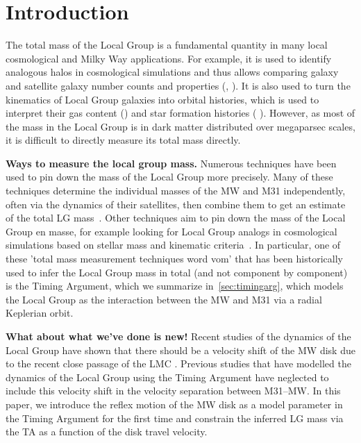 \documentclass[twocolumn]{aastex631}
\begin{document}
\section{Introduction}
\label{sec:intro}
The total mass of the Local Group is a fundamental quantity in many local
cosmological and Milky Way applications.
For example, it is used to identify analogous halos in cosmological simulations
and thus allows comparing galaxy and satellite galaxy number counts and
properties (, \citep{Patel2017a,Dooley2017,Besla2018,Patel2018,Sawala2022}).
It is also used to turn the kinematics of Local Group galaxies into orbital
histories, which is used to interpret their gas content () and star formation histories ( \citep{Weisz2011}).
However, as most of the mass in the Local Group is in dark matter distributed
over megaparsec scales, it is difficult to directly measure its total mass
directly.

\textbf{Ways to measure the local group mass.}
Numerous techniques have been used to pin down the mass of the Local Group
more precisely.
Many of these techniques determine the individual masses of the MW and M31
independently, often via the dynamics of their satellites, then combine them to
get an estimate of the total LG mass~\citep{Watkins2010,Diaz2014,Patel2018}.
Other techniques aim to pin down the mass of the Local Group en masse, for
example looking for Local Group analogs in cosmological simulations
based on stellar mass and kinematic criteria~\citep{Zhai2020}.
In particular, one of these 'total mass measurement techniques word vom'
that has been historically used to infer the
Local Group mass in total (and not component by component) is the Timing
Argument, which we summarize in~\ref{sec:timingarg}, which models the Local
Group as the interaction between the MW and M31 via a radial Keplerian orbit.

\textbf{What about what we've done is new!}
Recent studies of the dynamics of the Local Group have shown that there should
be a velocity shift of the MW disk due to the recent close passage of the LMC
\citep{Gomez2015,Garavito-Camargo2021b}.
Previous studies that have modelled the dynamics of the Local Group using the
Timing Argument have neglected to include this velocity shift in the velocity
separation between M31--MW.
In this paper, we introduce the reflex motion of the
MW disk as a model parameter in the Timing Argument for the first time and
constrain the inferred LG mass via the TA as a function of the disk travel
velocity.
\end{document}
